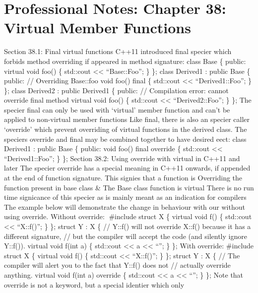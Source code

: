 \hypertarget{professional-notes-chapter-38-virtual-member-functions-1}{%
\section{Professional Notes: Chapter 38: Virtual Member
Functions}\label{professional-notes-chapter-38-virtual-member-functions-1}}

Section 38.1: Final virtual functions C++11 introduced final specier
which forbids method overriding if appeared in method signature: class
Base \{ public: virtual void foo() \{ std::cout \textless\textless{}
``Base::Foo\n''; \} \}; class Derived1 : public Base \{ public: //
Overriding Base::foo void foo() final \{ std::cout \textless\textless{}
``Derived1::Foo\n''; \} \}; class Derived2 : public Derived1 \{ public:
// Compilation error: cannot override final method virtual void foo() \{
std::cout \textless\textless{} ``Derived2::Foo\n''; \} \}; The specier
final can only be used with `virtual' member function and can't be
applied to non-virtual member functions Like final, there is also an
specier caller `override' which prevent overriding of virtual functions
in the derived class. The speciers override and final may be combined
together to have desired eect: class Derived1 : public Base \{ public:
void foo() final override \{ std::cout \textless\textless{}
``Derived1::Foo\n''; \} \}; Section 38.2: Using override with virtual in
C++11 and later The specier override has a special meaning in C++11
onwards, if appended at the end of function signature. This signies that
a function is Overriding the function present in base class \& The Base
class function is virtual There is no run time signicance of this
specier as is mainly meant as an indication for compilers The example
below will demonstrate the change in behaviour with our without using
override. Without override: \#include struct X \{ virtual void f() \{
std::cout \textless\textless{} ``X::f()\n''; \} \}; struct Y : X \{ //
Y::f() will not override X::f() because it has a different signature, //
but the compiler will accept the code (and silently ignore Y::f()).
virtual void f(int a) \{ std::cout \textless\textless{} a
\textless\textless{} ``\n''; \} \}; With override: \#include struct X \{
virtual void f() \{ std::cout \textless\textless{} ``X::f()\n''; \} \};
struct Y : X \{ // The compiler will alert you to the fact that Y::f()
does not // actually override anything. virtual void f(int a) override
\{ std::cout \textless\textless{} a \textless\textless{} ``\n''; \} \};
Note that override is not a keyword, but a special identier which only
